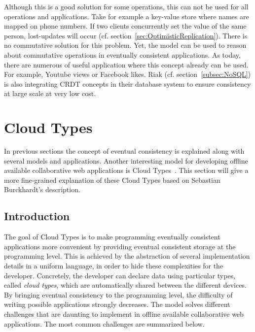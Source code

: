 \documentclass[a4paper,12pt]{report}
\begin{document}
Although this is a good solution for some operations, this can not be used for all operations and applications. Take for example a key-value store where names are mapped on phone numbers. If two clients concurrently set the value of the same person, lost-updates will occur (cf. section~\ref{sec:OptimisticReplication}). There is no commutative solution for this problem. Yet, the model can be used to reason about commutative operations in eventually consistent applications. As today, there are numerous of useful application where this concept already can be used. For example, Youtube views or Facebook likes. Riak (cf. section~\ref{subsec:NoSQL}) is also integrating CRDT concepts in their database system to ensure consistency at large scale at very low cost. 

\chapter{Cloud Types}\label{cha:CloudTypes} %

In previous sections the concept of eventual consistency is explained along with several models and applications. Another interesting model for developing offline available collaborative web applications is Cloud Types~\cite{Burckhardt}. This section will give a more fine-grained explanation of these Cloud Types based on Sebastian Burckhardt's description.

\section{Introduction}\label{sec:Introduction}

The goal of Cloud Types is to make programming eventually consistent applications more convenient by providing eventual consistent storage at the programming level. This is achieved by the abstraction of several implementation details in a uniform language, in order to hide these complexities for the developer. Concretely, the developer can declare data using particular types, called \textit{cloud types}, which are automatically shared between the different devices. By bringing eventual consistency to the programming level, the difficulty of writing possible applications strongly decreases. The model solves different challenges that are daunting to implement in offline available collaborative web applications. The most common challenges are summarized below.
\end{document}
